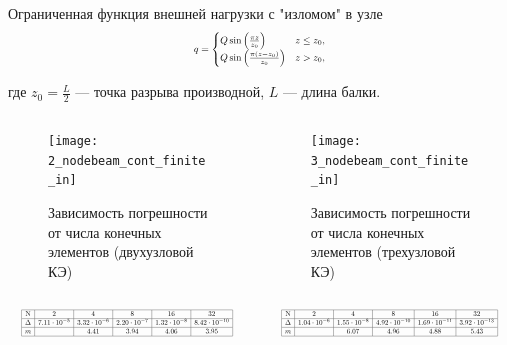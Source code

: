 \documentclass[7pt]{beamer}
\numberwithin{equation}{section}
\newcommand*{\Scale}[2][4]{\scalebox{#1}{$#2$}}
\begin{document}
\begin{frame}
	\begin{block}{Ограниченная функция внешней нагрузки с "изломом" в узле}
		\begin{equation}
			\Scale[0.7]{q = 
			\begin{cases}
				Q \sin \left(\frac{\pi  z}{z_{0}}\right) & z \leq  z_{0}, \\
				Q \sin \left(\frac{\pi  (z-z_{0})}{z_{0}}\right) & z > z_{0},
			\end{cases}
			}
		\end{equation}
	\end{block}
	где $z_{0}=\frac{L}{2}$ --- точка разрыва производной, $L$ --- длина балки. \\

		\begin{columns}
			\begin{column}{0.57\textwidth}
				\begin{figure}[H]
					\centering
					\texttt{[image: 2\_nodebeam\_cont\_finite\_in]}
					\caption{Зависимость погрешности от числа конечных элементов (двухузловой КЭ)}
					\label{fig:2_nodebeam_cont_finite_in}
				\end{figure}
			\end{column}
			\begin{column}{0.57\textwidth}
				\begin{figure}[H]
					\centering
					\texttt{[image: 3\_nodebeam\_cont\_finite\_in]}
					\caption{Зависимость погрешности от числа конечных элементов (трехузловой КЭ)}
					\label{fig:3_nodebeam_cont_finite_in}
				\end{figure}
			\end{column}
		\end{columns}
		\begin{columns}
			\begin{column}{0.5\textwidth}
				\[
					\Scale[0.5] {
							\begin{array}{|c|c|c|c|c|c|}
									\hline
									\text{N} & 2 & 4 & 8 & 16 & 32 \\ \hline
			\Delta  & 7.11 \cdot 10^{-5} & 3.32 \cdot 10^{-6} & 2.20 \cdot 10^{-7} & 1.32 \cdot 10^{-8} & 8.42 \cdot 10^{-10}\\ \hline
			m  &  & 4.41 & 3.94 & 4.06 & 3.95 \\ 
									\hline
									\end{array}
					}
				\]
			\end{column}
			\begin{column}{0.5\textwidth}
				\[
						\Scale[0.5] {
				\begin{array}{|c|c|c|c|c|c|}
				\hline
				\text{N} & 2 & 4 & 8 & 16 & 32 \\ \hline
			\Delta  & 1.04 \cdot 10^{-6} & 1.55 \cdot 10^{-8} & 4.92 \cdot 10^{-10} & 1.69 \cdot 10^{-11} & 3.92 \cdot 10^{-13} \\ \hline
			m  &  & 6.07 & 4.96 & 4.88 & 5.43 \\ 
				\hline
				\end{array}
					}
					\]
			\end{column}
		\end{columns}
	\end{frame}
\end{document}
